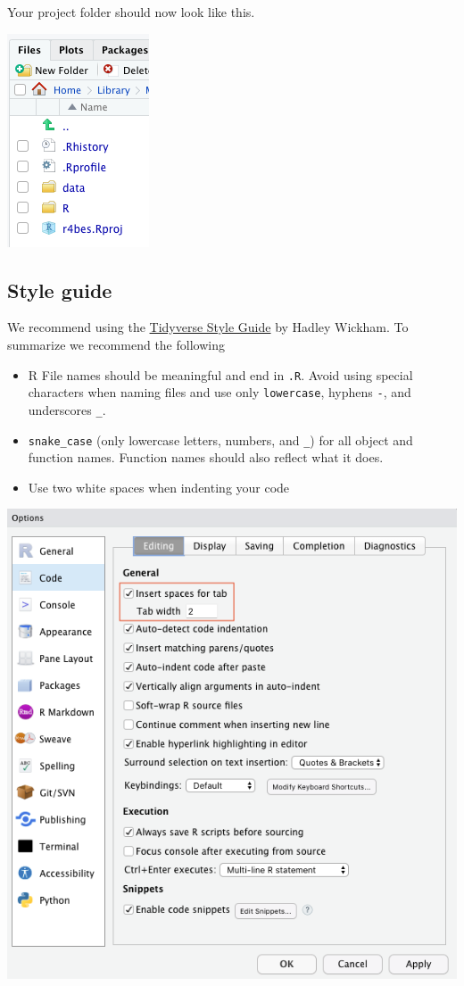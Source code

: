 \documentclass[
]{book}
\providecommand{\tightlist}{%
  \setlength{\itemsep}{0pt}\setlength{\parskip}{0pt}}
\begin{document}
Your project folder should now look like this.

\begin{center}\includegraphics[width=0.3\linewidth]{figures/file_structure} \end{center}

\hypertarget{style-guide}{%
\subsection*{Style guide}\label{style-guide}}

We recommend using the \href{https://style.tidyverse.org/index.html}{Tidyverse Style Guide} by Hadley Wickham. To summarize we recommend the following

\begin{itemize}
\tightlist
\item
  R File names should be meaningful and end in \texttt{.R}. Avoid using special characters when naming files and use only \texttt{lowercase}, hyphens \texttt{-}, and underscores \texttt{\_}.
\item
  \texttt{snake\_case} (only lowercase letters, numbers, and \texttt{\_}) for all object and function names. Function names should also reflect what it does.
\item
  Use two white spaces when indenting your code
\end{itemize}

\begin{center}\includegraphics[width=0.7\linewidth]{figures/indent_space} \end{center}
\end{document}
